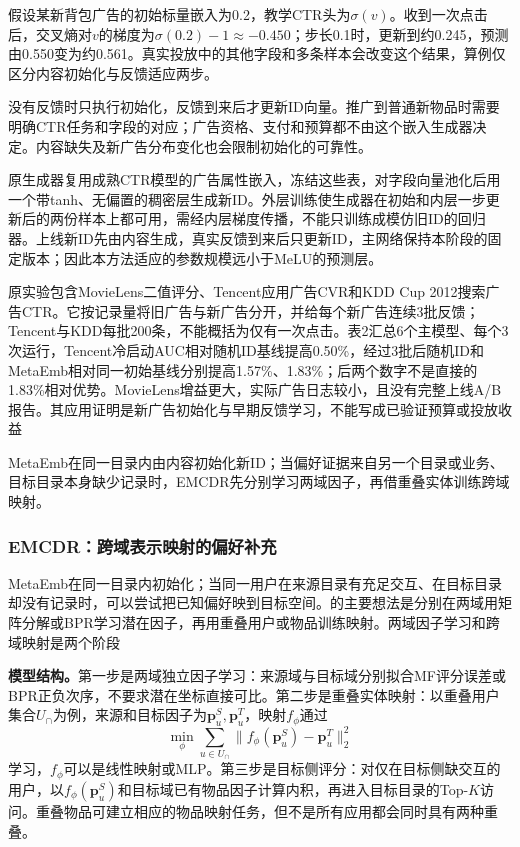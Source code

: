 假设某新背包广告的初始标量嵌入为0.2，教学CTR头为$\sigma(v)$。收到一次点击后，交叉熵对$v$的梯度为$\sigma(0.2)-1\approx-0.450$；步长0.1时，更新到约0.245，预测由0.550变为约0.561。真实投放中的其他字段和多条样本会改变这个结果，算例仅区分内容初始化与反馈适应两步。

没有反馈时只执行初始化，反馈到来后才更新ID向量。推广到普通新物品时需要明确CTR任务和字段的对应；广告资格、支付和预算都不由这个嵌入生成器决定。内容缺失及新广告分布变化也会限制初始化的可靠性。

原生成器复用成熟CTR模型的广告属性嵌入，冻结这些表，对字段向量池化后用一个带tanh、无偏置的稠密层生成新ID。外层训练使生成器在初始和内层一步更新后的两份样本上都可用，需经内层梯度传播，不能只训练成模仿旧ID的回归器。上线新ID先由内容生成，真实反馈到来后只更新ID，主网络保持本阶段的固定版本；因此本方法适应的参数规模远小于MeLU的预测层。

原实验包含MovieLens二值评分、Tencent应用广告CVR和KDD Cup 2012搜索广告CTR。它按记录量将旧广告与新广告分开，并给每个新广告连续3批反馈；Tencent与KDD每批200条，不能概括为仅有一次点击。表2汇总6个主模型、每个3次运行，Tencent冷启动AUC相对随机ID基线提高0.50\%，经过3批后随机ID和MetaEmb相对同一初始基线分别提高1.57\%、1.83\%；后两个数字不是直接的1.83\%相对优势。MovieLens增益更大，实际广告日志较小，且没有完整上线A/B报告。其应用证明是新广告初始化与早期反馈学习，不能写成已验证预算或投放收益

MetaEmb在同一目录内由内容初始化新ID；当偏好证据来自另一个目录或业务、目标目录本身缺少记录时，EMCDR先分别学习两域因子，再借重叠实体训练跨域映射。

\subsubsection{EMCDR：跨域表示映射的偏好补充}
\label{sec:rs-emcdr}

MetaEmb在同一目录内初始化；当同一用户在来源目录有充足交互、在目标目录却没有记录时，可以尝试把已知偏好映到目标空间。的主要想法是分别在两域用矩阵分解或BPR学习潜在因子，再用重叠用户或物品训练映射。两域因子学习和跨域映射是两个阶段

\textbf{模型结构。}第一步是两域独立因子学习：来源域与目标域分别拟合MF评分误差或BPR正负次序，不要求潜在坐标直接可比。第二步是重叠实体映射：以重叠用户集合$U_{\cap}$为例，来源和目标因子为$\bm{p}_u^S,\bm{p}_u^T$，映射$f_\phi$通过
\begin{equation}
  \min_\phi\sum_{u\in U_{\cap}}
     \lVert f_\phi(\bm{p}_u^S)-\bm{p}_u^T\rVert_2^2
  \label{eq:rs-emcdr-map}
\end{equation}
学习，$f_\phi$可以是线性映射或MLP。第三步是目标侧评分：对仅在目标侧缺交互的用户，以$f_\phi(\bm{p}_u^S)$和目标域已有物品因子计算内积，再进入目标目录的Top-$K$访问。重叠物品可建立相应的物品映射任务，但不是所有应用都会同时具有两种重叠。

